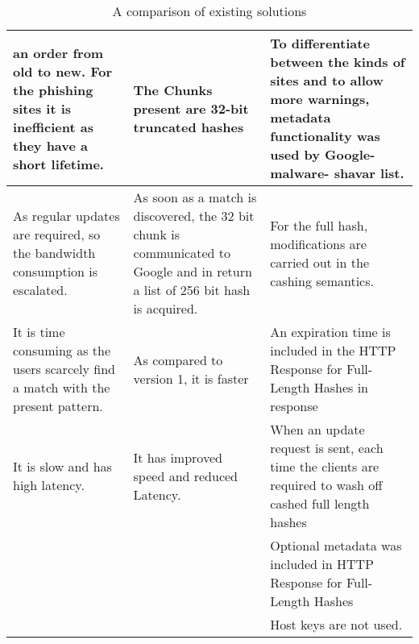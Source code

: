 \begin{singlespace}
\begin{table}[!h]
\begin{center}
\begin{tabular}{ | m{13em} | m{12.9em} | m{13em} | }
				an order from old to new. For the
				phishing sites it is inefficient as they
				have a short lifetime.                 & The Chunks present are 32-bit
				truncated hashes                       & To differentiate between the kinds of sites and
				to allow more warnings, metadata
				functionality was used by Google-malware-
				shavar list.                                                                                                                           \\
				\hline
				As regular updates are required, so the
				bandwidth consumption is escalated.    & As soon as a match is discovered,
				the 32 bit chunk is
				communicated to Google and in
				return a list of 256 bit hash is
				acquired.                              & For the full hash, modifications are carried out
				in the cashing semantics.                                                                                                              \\
				\hline

				It is time consuming as the users scarcely
				find a match with the present pattern. & As compared to version 1, it is
				faster                                 & An expiration time is included in the HTTP
				Response for Full-Length Hashes in
				response                                                                                                                               \\
				\hline

				It is slow and has high latency.       & It has improved speed and reduced
				Latency.                               & When an update request is sent, each time the
				clients are required to wash off cashed full
				length hashes                                                                                                                          \\
				\hline
				                                       &                                                  &   Optional metadata was included in HTTP
													   Response for Full-Length Hashes                                                                                                                      \\
				\hline
				                                       &                                                  & Host keys are not used.                                                                                               \\
				\hline
			\end{tabular}

		\caption{A comparison of existing solutions \citep{INTELLIGENT_PHISHING_ANFIS}}
		\end{center}
	\end{table}
\end{singlespace}

